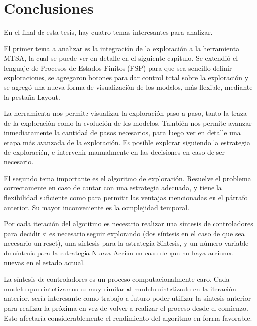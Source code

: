 \chapter{Conclusiones}

En el final de esta tesis, hay cuatro temas interesantes para analizar.

\vspace{\baselineskip}
El primer tema a analizar es la integración de la exploración a la herramienta MTSA, la cual se puede ver en detalle en el 
siguiente capítulo. 
Se extendió el lenguaje de Procesos de Estados Finitos (FSP) para que sea sencillo definir exploraciones, se agregaron botones 
para dar control total sobre la exploración y se agregó una nueva forma de visualización de los modelos, más flexible, mediante 
la pestaña Layout.

\vspace{\baselineskip}
La herramienta nos permite visualizar la exploración paso a paso, tanto la traza de la exploración como la 
evolución de los modelos. También nos permite avanzar inmediatamente la cantidad de pasos necesarios, para luego ver en detalle 
una etapa más avanzada de la exploración. Es posible explorar siguiendo la estrategia de exploración, e intervenir manualmente 
en las decisiones en caso de ser necesario.

\vspace{\baselineskip}
El segundo tema importante es el algoritmo de exploración. Resuelve el problema correctamente en caso de contar con una estrategia 
adecuada, y tiene la flexibilidad suficiente como para permitir las ventajas mencionadas en el párrafo anterior. Su mayor 
inconveniente es la complejidad temporal.

\vspace{\baselineskip}
Por cada iteración del algoritmo es necesario realizar una síntesis de controladores para decidir si es necesario seguir explorando 
(dos síntesis en el caso de que sea necesario un reset), una síntesis para la estrategia Síntesis, y un número variable de síntesis 
para la estrategia Nueva Acción en caso de que no haya acciones nuevas en el estado actual.

\vspace{\baselineskip}
La síntesis de controladores es un proceso computacionalmente caro. Cada modelo que sintetizamos es muy similar al modelo sintetizado 
en la iteración anterior, sería interesante como trabajo a futuro poder utilizar la síntesis anterior para realizar la próxima en 
vez de volver a realizar el proceso desde el comienzo. Esto afectaría considerablemente el rendimiento del algoritmo en forma favorable.

